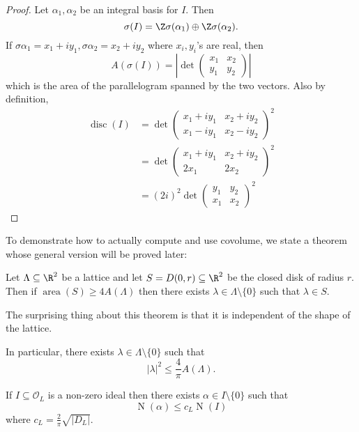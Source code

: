 \documentclass[a4paper]{article}
\renewcommand*{\O}{\mathcal{O}}
\DeclareMathOperator{\n}{N}
\DeclareMathOperator{\disc}{disc}
\begin{document}
\begin{proof}
  Let \(\alpha_1, \alpha_2\) be an integral basis for \(I\). Then
  \[
    \sigma(I) = \Z\sigma(\alpha_1) \oplus \Z\sigma(\alpha_2).
  \]
  If \(\sigma\alpha_1 = x_1 + iy_1, \sigma\alpha_2 = x_2 + iy_2\) where \(x_i, y_i\)'s are real, then
  \[
    A(\sigma(I))
    = \left| \det
      \begin{pmatrix}
        x_1 & x_2 \\
        y_1 & y_2
      \end{pmatrix}
    \right|
  \]
  which is the area of the parallelogram spanned by the two vectors. Also by definition,
  \begin{align*}
    \disc(I)
    &= \det
    \begin{pmatrix}
      x_1 + iy_1 & x_2 + iy_2 \\
      x_1 - iy_1 & x_2 - iy_2
    \end{pmatrix}
    ^2 \\
    &= \det
    \begin{pmatrix}
      x_1 + iy_1 & x_2 + iy_2 \\
      2x_1 & 2x_2
    \end{pmatrix}
    ^2 \\
    &= (2i)^2 \det
    \begin{pmatrix}
      y_1 & y_2 \\
      x_1 & x_2
    \end{pmatrix}
    ^2
  \end{align*}
\end{proof}

To demonstrate how to actually compute and use covolume, we state a theorem whose general version will be proved later:

\begin{theorem}
  Let \(\Lambda \subseteq \R^2\) be a lattice and let \(S = D(0, r) \subseteq \R^2\) be the closed disk of radius \(r\). Then if \(\operatorname{area}(S) \geq 4A(\Lambda)\) then there exists \(\lambda \in \Lambda \setminus \{0\}\) such that \(\lambda \in S\).
\end{theorem}

The surprising thing about this theorem is that it is independent of the shape of the lattice.

In particular, there exists \(\lambda \in  \Lambda \setminus \{0\}\) such that
\[
  |\lambda|^2 \leq \frac{4}{\pi} A(\Lambda).
\]

\begin{corollary}
  If \(I \subseteq \O_L\) is a non-zero ideal then there exists \(\alpha \in I \setminus \{0\}\) such that
  \[
    \n(\alpha) \leq c_L \n(I)
  \]
  where \(c_L = \frac{2}{\pi}\sqrt{|D_L|}\).
\end{corollary}
\end{document}
